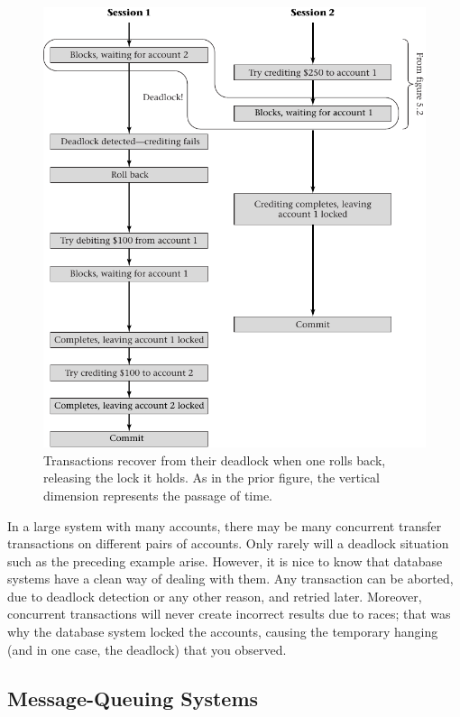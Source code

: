 \begin{figure}
\centerline{\includegraphics{hail_f0503}}
\caption{Transactions recover from their deadlock when one rolls back,
  releasing the lock it holds.  As in the prior figure, the vertical
  dimension represents the passage of time.}
\label{scan-5-3}
\end{figure}


In a large system with many accounts, there may be many concurrent
transfer transactions on different pairs of accounts.  Only
rarely will a deadlock situation such as the preceding example arise.
However, it is nice to know that database systems have a clean way of
dealing with them.  Any transaction can be aborted, due to deadlock
detection or any other reason, and retried later.  Moreover, concurrent
transactions will never create incorrect results due to races; that was why
the database system locked the accounts, causing the temporary hanging
(and in one case, the deadlock) that you observed.

\subsection{Message-Queuing Systems}\label{transactions-message-queuing-systems-section}

